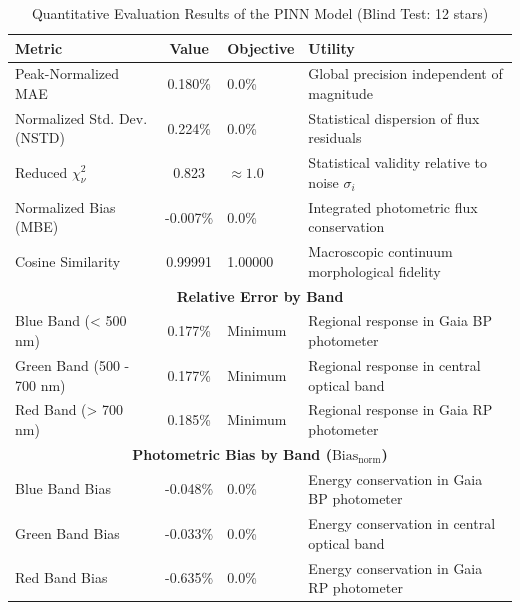 
\begin{table}[htpb]
\centering
\caption{Quantitative Evaluation Results of the PINN Model (Blind Test: 12 stars)}
\label{tab:pinn_evaluation}
\begin{tabular}{lcll}
\hline
\textbf{Metric} & \textbf{Value} & \textbf{Objective} & \textbf{Utility} \\
\hline
Peak-Normalized MAE & 0.180\% & 0.0\% & Global precision independent of magnitude \\
Normalized Std. Dev. (NSTD) & 0.224\% & 0.0\% & Statistical dispersion of flux residuals \\
Reduced $\chi^2_\nu$ & 0.823 & $\approx 1.0$ & Statistical validity relative to noise $\sigma_i$ \\
Normalized Bias (MBE) & -0.007\% & 0.0\% & Integrated photometric flux conservation \\
Cosine Similarity & 0.99991 & 1.00000 & Macroscopic continuum morphological fidelity \\
\hline
\multicolumn{4}{c}{\textbf{Relative Error by Band}} \\
\hline
Blue Band (< 500 nm) & 0.177\% & Minimum & Regional response in Gaia BP photometer \\
Green Band (500 - 700 nm) & 0.177\% & Minimum & Regional response in central optical band \\
Red Band (> 700 nm) & 0.185\% & Minimum & Regional response in Gaia RP photometer \\
\hline
\multicolumn{4}{c}{\textbf{Photometric Bias by Band ($\text{Bias}_{\text{norm}}$)}} \\
\hline
Blue Band Bias & -0.048\% & 0.0\% & Energy conservation in Gaia BP photometer \\
Green Band Bias & -0.033\% & 0.0\% & Energy conservation in central optical band \\
Red Band Bias & -0.635\% & 0.0\% & Energy conservation in Gaia RP photometer \\
\hline
\end{tabular}
\end{table}
